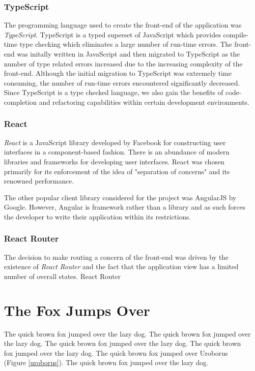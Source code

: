 \documentclass{l4proj}
\begin{document}
        \subsubsection{TypeScript}
        The programming language used to create the front-end of the application was \textit{TypeScript}. TypeScript is a typed superset of JavaScript which provides compile-time type checking which eliminates a large number of run-time errors. The front-end was initally written in JavaScript and then migrated to TypeScript as the number of type related errors increased due to the increasing complexity of the front-end. Although the initial migration to TypeScript was extremely time consuming, the number of run-time errors encountered significantly decreased. Since TypeScript is a type checked language, we also gain the benefits of code-completion and refactoring capabilities within certain development environments. 
    
        \subsubsection{React}
        \textit{React} is a JavaScript library developed by Facebook for constructing user interfaces in a component-based fashion. There is an abundance of modern libraries and frameworks for developing user interfaces. React was chosen primarily for its enforcement of the idea of "separation of concerns" and its renowned performance.
        
        The other popular client library considered for the project was AngularJS by Google. However, Angular is framework rather than a library and as such forces the developer to write their application within its restrictions.

        \subsubsection{React Router}
        The decision to make routing a concern of the front-end was driven by the existence of \textit{React Router} and the fact that the application view has a limited number of overall states. React Router




\section{The Fox Jumps Over}
The quick brown fox jumped over the lazy dog.
The quick brown fox jumped over the lazy dog.
The quick brown fox jumped over the lazy dog.
The quick brown fox jumped over the lazy dog.
The quick brown fox jumped over Uroborus (Figure \ref{uroborus}).
The quick brown fox jumped over the lazy dog.
\end{document}
